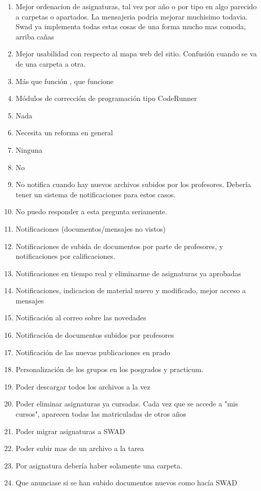 \begin{enumerate}
\item Mejor ordenacion de asignaturas, tal vez por año o por tipo en algo parecido a carpetas o apartados. La mensajeria podria mejorar muchisimo todavia. Swad ya implementa todas estas cosas de una forma mucho mas comoda, arriba cañas
\item Mejor usabilidad con respecto al mapa web del sitio. Confusión cuando se va de una carpeta a otra.
\item Más que función , que funcione
\item Módulos de corrección de programación tipo CodeRunner
\item Nada
\item Necesita un reforma en general
\item Ninguna
\item No
\item No notifica cuando hay nuevos archivos subidos por los profesores. Debería tener un sistema de notificaciones para estos casos.
\item No puedo responder a esta pregunta seriamente.
\item Notificaciones (documentos/mensajes no vistos)
\item Notificaciones de subida de documentos por parte de profesores, y notificaciones por calificaciones.
\item Notificaciones en tiempo real y eliminarme de asignaturas ya aprobadas
\item Notificaciones, indicacion de material nuevo y modificado, mejor acceso a mensajes
\item Notificación al correo sobre las novedades
\item Notificación de documentos subidos por profesores
\item Notificación de las nuevas publicaciones en prado
\item Personalización de los grupos en los posgrados y practicum.
\item Poder descargar todos los archivos a la vez
\item Poder eliminar asignaturas ya cursadas. Cada vez que se accede a "mis cursos", aparecen todas las matriculadas de otros años
\item Poder migrar asignaturas a SWAD
\item Poder subir mas de un archivo a la tarea
\item Por asignatura debería haber solamente una carpeta.
\item Que anunciase si se han subido documentos nuevos como hacía SWAD

\end{enumerate}
